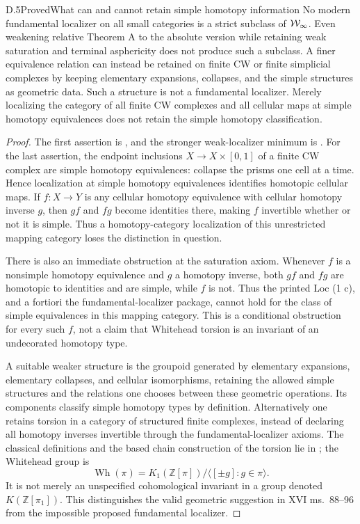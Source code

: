 \begin{claim}{D.5}{Proved}{What can and cannot retain simple homotopy information}
No modern fundamental localizer on all small categories is a strict subclass of $\mathcal{W}_{\infty}$. Even weakening relative Theorem A to the absolute version while retaining weak saturation and terminal asphericity does not produce such a subclass. A finer equivalence relation can instead be retained on finite CW or finite simplicial complexes by keeping elementary expansions, collapses, and the simple structures as geometric data. Such a structure is not a fundamental localizer. Merely localizing the category of all finite CW complexes and all cellular maps at simple homotopy equivalences does not retain the simple homotopy classification.
\end{claim}
\begin{proof}
The first assertion is , and the stronger weak-localizer minimum is . For the last assertion, the endpoint inclusions $X\to X\times[0,1]$ of a finite CW complex are simple homotopy equivalences: collapse the prisms one cell at a time. Hence localization at simple homotopy equivalences identifies homotopic cellular maps. If $f:X\to Y$ is any cellular homotopy equivalence with cellular homotopy inverse $g$, then $gf$ and $fg$ become identities there, making $f$ invertible whether or not it is simple. Thus a homotopy-category localization of this unrestricted mapping category loses the distinction in question.

There is also an immediate obstruction at the saturation axiom. Whenever $f$ is a nonsimple homotopy equivalence and $g$ a homotopy inverse, both $gf$ and $fg$ are homotopic to identities and are simple, while $f$ is not. Thus the printed Loc (1 c), and a fortiori the fundamental-localizer package, cannot hold for the class of simple equivalences in this mapping category. This is a conditional obstruction for every such $f$, not a claim that Whitehead torsion is an invariant of an undecorated homotopy type.

A suitable weaker structure is the groupoid generated by elementary expansions, elementary collapses, and cellular isomorphisms, retaining the allowed simple structures and the relations one chooses between these geometric operations. Its components classify simple homotopy types by definition. Alternatively one retains torsion in a category of structured finite complexes, instead of declaring all homotopy inverses invertible through the fundamental-localizer axioms. The classical definitions and the based chain construction of the torsion lie in \citet[Definition 2, Example 3, and Definition 17]{RootLurie2014Whitehead}; the Whitehead group is
\[
 \operatorname{Wh}(\pi)=K_1(\mathbb Z[\pi])/\langle[\pm g]:g\in\pi\rangle.
\]
It is not merely an unspecified cohomological invariant in a group denoted $K(\mathbb Z[\pi_1])$. This distinguishes the valid geometric suggestion in XVI ms.~88--96 from the impossible proposed fundamental localizer.
\end{proof}

